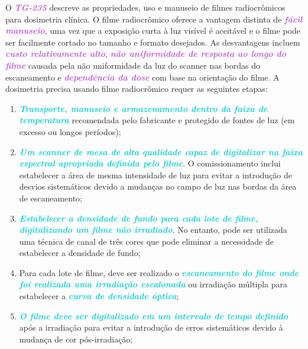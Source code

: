 \documentclass[11pt,a4paper]{article}
\begin{document}
	O \textcolor{MediumOrchid}{\textbf{\textit{TG-235}}} descreve as propriedades, uso e manuseio de filmes radiocrômicos para dosimetria clínica. O filme radiocrômico oferece a vantagem distinta de \textcolor{MediumOrchid}{\textbf{\textit{fácil manuseio}}}, uma vez que a exposição curta à luz visível é aceitável e o filme pode ser facilmente cortado no tamanho e formato desejados. As desvantagens incluem \textcolor{MediumOrchid}{\textbf{\textit{custo relativamente alto}}}, \textcolor{MediumOrchid}{\textbf{\textit{não uniformidade de resposta ao longo do filme}}} causada pela não uniformidade da luz do scanner nas bordas do escaneamento e \textcolor{MediumOrchid}{\textbf{\textit{dependência da dose}}} com base na orientação do filme. A dosimetria precisa usando filme radiocrômico requer as seguintes etapas:

	\begin{enumerate}[label=\textcolor{CarnationPink}{\arabic*${}^\circ $}]
		\item \textcolor{DarkTurquoise}{\textbf{\textit{Transporte, manuseio e armazenamento dentro da faixa de temperatura}}} recomendada pelo fabricante e protegido de fontes de luz (em excesso ou longos períodos);
		
		\item \textcolor{DarkTurquoise}{\textbf{\textit{Um scanner de mesa de alta qualidade capaz de digitalizar na faixa espectral apropriada definida pelo filme}}}. O comissionamento inclui estabelecer a área de mesma intensidade de luz para evitar a introdução de desvios sistemáticos devido a mudanças no campo de luz nas bordas da área de escaneamento;
		
		\item \textcolor{DarkTurquoise}{\textbf{\textit{Estabelecer a densidade de fundo para cada lote de filme, digitalizando um filme não irradiado}}}. No entanto, pode ser utilizada uma técnica de canal de três cores que pode eliminar a necessidade de estabelecer a densidade de fundo;
		
		\item Para cada lote de filme, deve ser realizado o \textcolor{DarkTurquoise}{\textbf{\textit{escaneamento do filme onde foi realizada uma irradiação escalonada}}} ou irradiação múltipla para estabelecer a \textcolor{DarkTurquoise}{\textbf{\textit{curva de densidade óptica}}};
		
		\item \textcolor{DarkTurquoise}{\textbf{\textit{O filme deve ser digitalizado em um intervalo de tempo definido}}} após a irradiação para evitar a introdução de erros sistemáticos devido à mudança de cor pós-irradiação;
	\end{enumerate}
\end{document}
